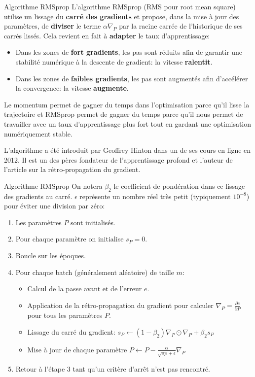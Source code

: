 \begin{frame}{Algorithme RMSprop}
	L'algorithme RMSprop (RMS pour root mean square) utilise un lissage du \textbf{carré des gradients} et propose, dans la mise à jour des paramètres, de \textbf{diviser} le terme $\alpha \nabla_P$ par la racine carrée de l'historique de ses carrés lissés. Cela revient en fait à \textbf{adapter} le taux d'apprentissage:
	\pause
	\begin{itemize}
		\item Dans les zones de \textbf{fort gradients}, les pas sont réduits afin de garantir une stabilité numérique à la descente de gradient: la vitesse \textbf{ralentit}.
		\item Dans les zones de \textbf{faibles gradients}, les pas sont augmentés afin d'accélérer la convergence: la vitesse \textbf{augmente}.
	\end{itemize}
	\pause
	Le momentum permet de gagner du temps dans l'optimisation parce qu'il lisse la trajectoire et RMSprop permet de gagner du temps parce qu'il nous permet de travailler avec un taux d'apprentissage plus fort tout en gardant une optimisation numériquement stable.
	
	\vspace{0.3cm}
	\pause
	
	L'algorithme a été introduit par Geoffrey Hinton dans un de ses cours en ligne en 2012. Il est un des pères fondateur de l'apprentissage profond et l'auteur de l'article sur la rétro-propagation du gradient.
\end{frame}

\begin{frame}{Algorithme RMSprop}
	On notera $\beta_2$ le coefficient de pondération dans ce lissage des gradients au carré. $\epsilon$ représente un nombre réel très petit (typiquement $10^{-8}$) pour éviter une division par zéro:
	\begin{enumerate}
		\item Les paramètres $P$ sont initialisés.
		\pause
		\item Pour chaque paramètre on initialise $s_P = 0$.
		\pause
		\item Boucle sur les époques.
		\pause
		\item Pour chaque batch (généralement aléatoire) de taille $m$:
		\begin{itemize}
			\item Calcul de la passe avant et de l'erreur $e$.
			\pause
			\item Application de la rétro-propagation du gradient pour calculer $\nabla_P = \frac{\partial{e}}{\partial{P}}$ pour tous les paramètres $P$.
			\pause
			\item Lissage du carré du gradient: $s_P \leftarrow (1 - \beta_2) \nabla_P \odot \nabla_P + \beta_2 s_P$
			\pause 
			\item Mise à jour de chaque paramètre $P \leftarrow P - \frac{\alpha}{\sqrt{s_P} + \epsilon} \nabla_P$
		\end{itemize}
		\item Retour à l'étape 3 tant qu'un critère d'arrêt n'est pas rencontré.
	\end{enumerate}	
\end{frame}

